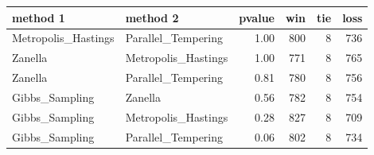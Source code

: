 \begin{table}[ht]
\centering
\begin{tabular}{llrrrr}
  \hline
method 1 & method 2 & pvalue & win & tie & loss \\ 
  \hline
Metropolis\_Hastings & Parallel\_Tempering & 1.00 & 800 &   8 & 736 \\ 
  Zanella & Metropolis\_Hastings & 1.00 & 771 &   8 & 765 \\ 
  Zanella & Parallel\_Tempering & 0.81 & 780 &   8 & 756 \\ 
  Gibbs\_Sampling & Zanella & 0.56 & 782 &   8 & 754 \\ 
  Gibbs\_Sampling & Metropolis\_Hastings & 0.28 & 827 &   8 & 709 \\ 
  Gibbs\_Sampling & Parallel\_Tempering & 0.06 & 802 &   8 & 734 \\ 
   \hline
\end{tabular}
\end{table}
